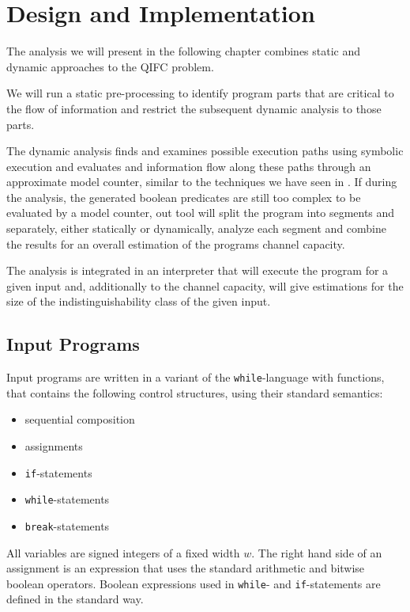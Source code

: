 \chapter{Design and Implementation}\label{sec:impl}

The analysis we will present in the following chapter combines static and dynamic approaches to the QIFC problem. 

We will run a static pre-processing to identify program parts that are critical to the flow of information and restrict the subsequent dynamic analysis to those parts.

The dynamic analysis finds and examines possible execution paths using symbolic execution and evaluates and information flow along these paths through an approximate model counter, similar to the techniques we have seen in \cite{klebanov13, biondi18, chu19}.
If during the analysis, the generated boolean predicates are still too complex to be evaluated by a model counter, out tool will split the program into segments and separately, either statically or dynamically, analyze each segment and combine the results for an overall estimation of the programs channel capacity.

The analysis is integrated in an interpreter that will execute the program for a given input and, additionally to the channel capacity, will give estimations for the size of the indistinguishability class of the given input.


\section{Input Programs}\label{sec:inputLang}

Input programs are written in a variant of the \texttt{while}-language with functions, that contains the following control structures, using their standard semantics:
\begin{itemize}
    \setlength\itemsep{0em}
    \item sequential composition
    \item assignments
    \item \texttt{if}-statements
    \item \texttt{while}-statements
    \item \texttt{break}-statements
\end{itemize}
All variables are signed integers of a fixed width $w$. The right hand side of an assignment is an expression that uses the standard arithmetic and bitwise boolean operators. Boolean expressions used in \texttt{while}- and \texttt{if}-statements are defined in the standard way.

